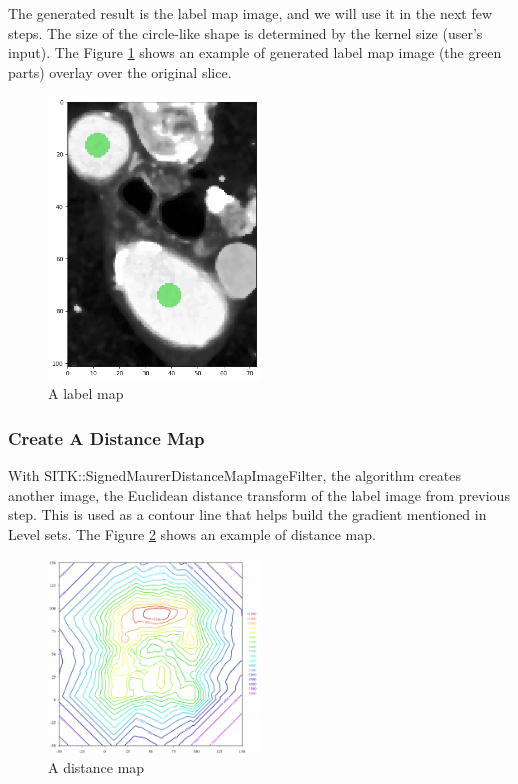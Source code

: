 The generated result is the label map image, and we will use it in the next few steps. The size of the circle-like shape is determined by the kernel size (user's input). The Figure \ref{fig_label_map} shows an example of generated label map image (the green parts) overlay over the original slice.

\begin{figure}[H]
    \centering
    \includegraphics[width=0.5\textwidth]{figures/AGR/label_image.png}
    \caption[A label image]{A label map}
    \label{fig_label_map}
\end{figure}

\subsubsection{Create A Distance Map}\label{distance_map}
With SITK::SignedMaurerDistanceMapImageFilter, the algorithm creates another image, the Euclidean distance transform of the label image from previous step. This is used as a contour line that helps build the gradient mentioned in Level sets. The Figure \ref{fig_distance_map} shows an example of distance map.

\begin{figure}[H]
    \centering
    \includegraphics[width=0.5\textwidth]{figures/AGR/Contour2D.png}
    \caption[A distance map]{A distance map}
    \label{fig_distance_map}
\end{figure}


